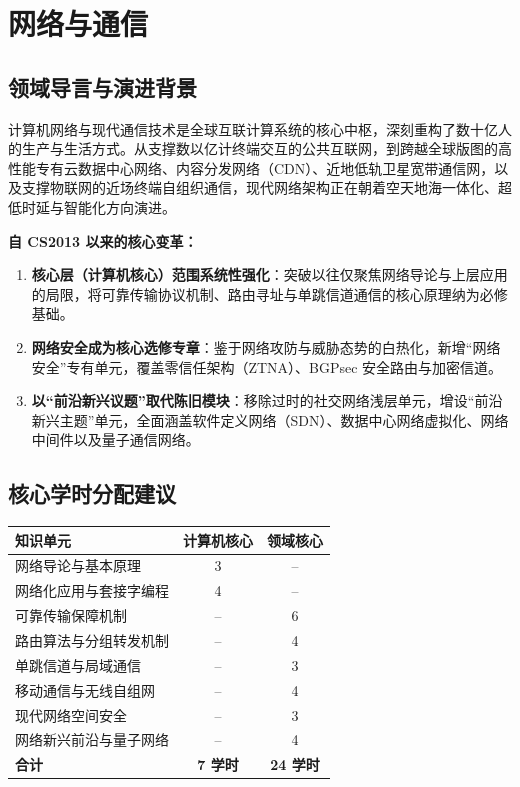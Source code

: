 \chapter{网络与通信}

\section{领域导言与演进背景}

\begin{preamblebox}[知识领域概述与变革]
计算机网络与现代通信技术是全球互联计算系统的核心中枢，深刻重构了数十亿人的生产与生活方式。从支撑数以亿计终端交互的公共互联网，到跨越全球版图的高性能专有云数据中心网络、内容分发网络（CDN）、近地低轨卫星宽带通信网，以及支撑物联网的近场终端自组织通信，现代网络架构正在朝着空天地海一体化、超低时延与智能化方向演进。

\textbf{自 CS2013 以来的核心变革：}
\begin{enumerate}
    \item \textbf{核心层（计算机核心）范围系统性强化}：突破以往仅聚焦网络导论与上层应用的局限，将可靠传输协议机制、路由寻址与单跳信道通信的核心原理纳为必修基础。
    \item \textbf{网络安全成为核心选修专章}：鉴于网络攻防与威胁态势的白热化，新增“网络安全”专有单元，覆盖零信任架构（ZTNA）、BGPsec 安全路由与加密信道。
    \item \textbf{以“前沿新兴议题”取代陈旧模块}：移除过时的社交网络浅层单元，增设“前沿新兴主题”单元，全面涵盖软件定义网络（SDN）、数据中心网络虚拟化、网络中间件以及量子通信网络。
\end{enumerate}
\end{preamblebox}

\section{核心学时分配建议}

\begin{table}[H]
\centering
\setlength{\tabcolsep}{3.5pt}\fontsize{8pt}{9.6pt}\selectfont\begin{tabularx}{\columnwidth}{Y c c}
\toprule
\textbf{知识单元} & \textbf{计算机核心} & \textbf{领域核心} \\
\midrule
网络导论与基本原理 & 3 & -- \\
网络化应用与套接字编程 & 4 & -- \\
可靠传输保障机制 & -- & 6 \\
路由算法与分组转发机制 & -- & 4 \\
单跳信道与局域通信 & -- & 3 \\
移动通信与无线自组网 & -- & 4 \\
现代网络空间安全 & -- & 3 \\
网络新兴前沿与量子网络 & -- & 4 \\
\midrule
\textbf{合计} & \textbf{7 学时} & \textbf{24 学时} \\
\bottomrule
\end{tabularx}
\end{table}

